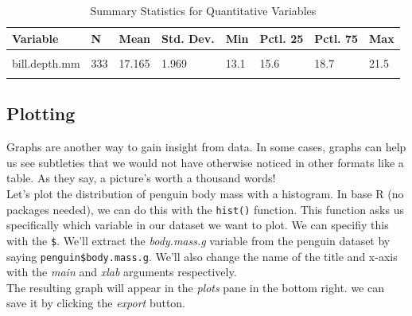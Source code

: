 \documentclass[
]{article}
\newenvironment{Shaded}{\begin{snugshade}}{\end{snugshade}}
\newcommand{\AttributeTok}[1]{\textcolor[rgb]{0.77,0.63,0.00}{#1}}
\newcommand{\FunctionTok}[1]{\textcolor[rgb]{0.00,0.00,0.00}{#1}}
\newcommand{\NormalTok}[1]{#1}
\newcommand{\SpecialCharTok}[1]{\textcolor[rgb]{0.00,0.00,0.00}{#1}}
\newcommand{\StringTok}[1]{\textcolor[rgb]{0.31,0.60,0.02}{#1}}
\begin{document}
\begin{table}[!h]

\caption{\label{tab:summary stats quant}Summary Statistics for Quantitative Variables}
\centering
\begin{tabular}[t]{llllllll}
\toprule
Variable & N & Mean & Std. Dev. & Min & Pctl. 25 & Pctl. 75 & Max\\
\midrule
\cellcolor{gray!6}{bill.length.mm} & \cellcolor{gray!6}{333} & \cellcolor{gray!6}{43.993} & \cellcolor{gray!6}{5.469} & \cellcolor{gray!6}{32.1} & \cellcolor{gray!6}{39.5} & \cellcolor{gray!6}{48.6} & \cellcolor{gray!6}{59.6}\\
bill.depth.mm & 333 & 17.165 & 1.969 & 13.1 & 15.6 & 18.7 & 21.5\\
\cellcolor{gray!6}{body.mass.g} & \cellcolor{gray!6}{333} & \cellcolor{gray!6}{4207.057} & \cellcolor{gray!6}{805.216} & \cellcolor{gray!6}{2700} & \cellcolor{gray!6}{3550} & \cellcolor{gray!6}{4775} & \cellcolor{gray!6}{6300}\\
\bottomrule
\end{tabular}
\end{table}

\hypertarget{plotting}{%
\subsection{Plotting}\label{plotting}}

Graphs are another way to gain insight from data. In some cases, graphs
can help us see subtleties that we would not have otherwise noticed in
other formats like a table. As they say, a picture's worth a thousand
words!\\
Let's plot the distribution of penguin body mass with a histogram. In
base R (no packages needed), we can do this with the \texttt{hist()}
function. This function asks us specifically which variable in our
dataset we want to plot. We can specifiy this with the \texttt{\$}.
We'll extract the \emph{body.mass.g} variable from the penguin dataset
by saying \texttt{penguin\$body.mass.g}. We'll also change the name of
the title and x-axis with the \emph{main} and \emph{xlab} arguments
respectively.\\
The resulting graph will appear in the \emph{plots} pane in the bottom
right. we can save it by clicking the \emph{export} button.

\begin{Shaded}
\end{Shaded}
\end{document}
